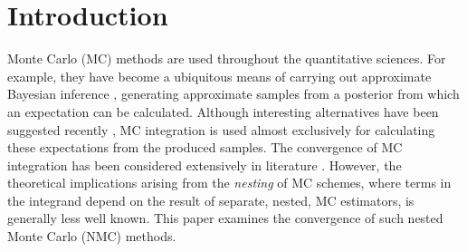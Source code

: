 
\section{Introduction}
\label{sec:intro}


Monte Carlo (MC) methods \citep{metropolis1949monte,robert2004monte} are used throughout the quantitative sciences.
For example, they have become a ubiquitous means of carrying out approximate Bayesian inference \citep{doucet2001introduction,gilks1995markov}, generating approximate samples from a posterior from which an expectation can be calculated.
Although interesting alternatives have been suggested recently \citep{briol2015probabilistic}, MC integration is used almost exclusively for calculating these expectations from the produced samples.
The convergence of MC integration has been considered extensively in 
literature \citep{gilks2005markov,robert2004monte}.  However, the theoretical implications
arising from the \emph{nesting} of MC schemes, where terms in the integrand depend on the
result of separate, nested, MC estimators, is generally less well known.
This paper examines the convergence of such nested Monte Carlo (NMC) methods.  

